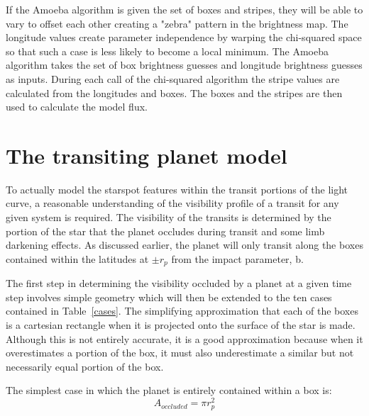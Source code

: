 \documentclass[iop]{emulateapj}
\begin{document}
If the Amoeba algorithm is given the set of boxes and stripes, they will be able to vary to offset each other creating a "zebra" pattern in the brightness map.  The longitude values create parameter independence by warping the chi-squared space so that such a case is less likely to become a local minimum. The Amoeba algorithm takes the set of box brightness guesses and longitude brightness guesses as inputs. During each call of the chi-squared algorithm the stripe values are calculated from the longitudes and boxes. The boxes and the stripes are then used to calculate the model flux.

\vspace{9mm}
\section{The transiting planet model \label{transit_model}}
To actually model the starspot features within the transit portions of the light curve, a reasonable understanding of the visibility profile of a transit for any given system is required. The visibility of the transits is determined by the portion of the star that the planet occludes during transit and some limb darkening effects. As discussed earlier, the planet will only transit along the boxes contained within the latitudes at $\pm r_p$ from the impact parameter, b. 
 
The first step in determining the visibility occluded by a planet at a given time step involves simple geometry which will then be extended to the ten cases contained in Table~\ref{cases}. The simplifying approximation that each of the boxes is a cartesian rectangle when it is projected onto the surface of the star is made. Although this is not entirely accurate, it is a good approximation because when it overestimates a portion of the box, it must also underestimate a similar but not necessarily equal portion of the box.

The simplest case in which the planet is entirely contained within a box is:
\begin{equation}
	A_{occluded} = \pi r_p^2
\end{equation}
\end{document}

